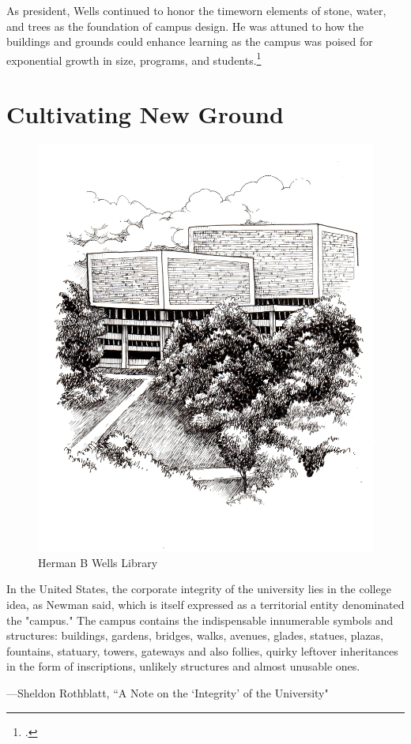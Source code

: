 \documentclass[
  american,
  letterpaper,
]{scrreprt}
\begin{document}
As president, Wells continued to honor the timeworn elements of stone,
water, and trees as the foundation of campus design. He was attuned to
how the buildings and grounds could enhance learning as the campus was
poised for exponential growth in size, programs, and
students.\footnote{.}


\chapter{Cultivating New Ground}\label{sec-six}

\begin{figure}[H]

{\centering \includegraphics[width=0.6\linewidth,height=\textheight,keepaspectratio]{images/miu6.jpeg}

}

\caption{Herman B Wells Library}

\end{figure}%

\epigraph{
In the United States, the corporate integrity of the university lies in the college idea, as Newman said, which is itself expressed as a territorial entity denominated the "campus." The campus contains the indispensable innumerable symbols and structures: buildings, gardens, bridges, walks, avenues, glades, statues, plazas, fountains, statuary, towers, gateways and also follies, quirky leftover inheritances in the form of inscriptions, unlikely structures and almost unusable ones.  
}
{---Sheldon Rothblatt, ``A Note on the `Integrity' of the University"}
\end{document}
